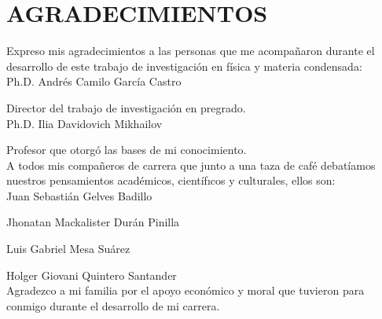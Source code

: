 \chapter*{AGRADECIMIENTOS}

Expreso mis agradecimientos a las personas que me acompañaron durante el desarrollo de este trabajo de investigación en física y materia condensada:\\

Ph.D. Andrés Camilo García Castro

Director del trabajo de investigación en pregrado.\\

Ph.D. Ilia Davidovich Mikhailov

Profesor que otorgó las bases de mi conocimiento.\\

A todos mis compañeros de carrera que junto a una taza de café debatíamos nuestros pensamientos académicos, científıcos y culturales, ellos son:\\

Juan Sebastián Gelves Badillo

Jhonatan Mackalister Durán Pinilla

Luis Gabriel Mesa Suárez

Holger Giovani Quintero Santander\\

Agradezco a mi familia por el apoyo económico y moral que tuvieron para conmigo durante el desarrollo de mi carrera.\\
\newpage 
